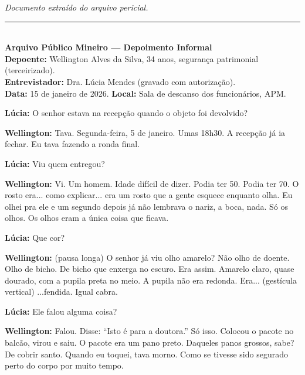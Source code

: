 
\noindent \textit{Documento extraído do arquivo pericial.}

\vspace{0.5em}\noindent\rule{\textwidth}{0.5pt}\vspace{0.5em}

\\[-0.2em]

\noindent \textbf{Arquivo Público Mineiro --- Depoimento Informal}\\
\noindent \textbf{Depoente:} Wellington Alves da Silva, 34 anos, segurança patrimonial (terceirizado).\\
\noindent \textbf{Entrevistador:} Dra. Lúcia Mendes (gravado com autorização).\\
\noindent\textbf{Data:} 15 de janeiro de 2026. \textbf{Local:} Sala de descanso dos funcionários, APM.

\noindent \textbf{Lúcia:} O senhor estava na recepção quando o objeto foi devolvido?

\noindent \textbf{Wellington:} Tava. Segunda-feira, 5 de janeiro. Umas 18h30. A recepção já ia fechar. Eu tava fazendo a ronda final.

\noindent \textbf{Lúcia:} Viu quem entregou?

\noindent \textbf{Wellington:} Vi. Um homem. Idade difícil de dizer. Podia ter 50. Podia ter 70. O rosto era... como explicar... era um rosto que a gente esquece enquanto olha. Eu olhei pra ele e um segundo depois já não lembrava o nariz, a boca, nada. Só os olhos. Os olhos eram a única coisa que ficava.

\noindent \textbf{Lúcia:} Que cor?

\noindent \textbf{Wellington:} (pausa longa) O senhor já viu olho amarelo? Não olho de doente. Olho de bicho. De bicho que enxerga no escuro. Era assim. Amarelo claro, quase dourado, com a pupila preta no meio. A pupila não era redonda. Era... (gestícula vertical) ...fendida. Igual cabra.

\noindent \textbf{Lúcia:} Ele falou alguma coisa?

\noindent \textbf{Wellington:} Falou. Disse: \textquotedblleft{}Isto é para a doutora.\textquotedblright{} Só isso. Colocou o pacote no balcão, virou e saiu. O pacote era um pano preto. Daqueles panos grossos, sabe? De cobrir santo. Quando eu toquei, tava morno. Como se tivesse sido segurado perto do corpo por muito tempo.

